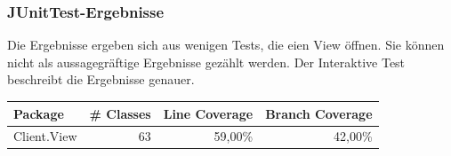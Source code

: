 \documentclass[a4paper]{article}
\begin{document}
\subsubsection{JUnitTest-Ergebnisse}
Die Ergebnisse ergeben sich aus wenigen Tests, die eien View öffnen. Sie können nicht als aussagegräftige Ergebnisse gezählt werden. Der Interaktive Test beschreibt die Ergebnisse genauer.

\noindent
\begin{tabular}{|l|l|l|l|}
\hline
Package & \# Classes & Line Coverage & Branch Coverage \\ \hline
Client.View & \multicolumn{1}{r|}{63} & \multicolumn{1}{r|}{59,00\%} & \multicolumn{1}{r|}{42,00\%} \\ \hline
\end{tabular}

\ \\
\end{document}
